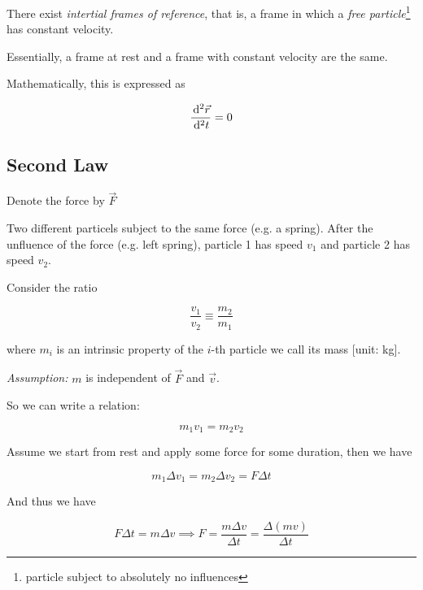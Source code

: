 There exist \textit{intertial frames of reference}, that is, a frame in which a \textit{free particle}\footnote{particle subject to absolutely no influences} has constant velocity.

\begin{remark}
	Essentially, a frame at rest and a frame with constant velocity are the same.
\end{remark}

Mathematically, this is expressed as

\begin{equation}
	\frac{\D^2 \vec r}{\D^2 t} = 0
\end{equation}

\subsection{Second Law}

Denote the force by $\vec F$

Two different particels subject to the same force (e.g. a spring). After the unfluence of the force (e.g. left spring), particle 1 has speed $v_1$ and particle 2 has speed $v_2$.

Consider the ratio

\begin{equation}
	\frac{v_1}{v_2} \equiv \frac{m_2}{m_1}
\end{equation}

where $m_i$ is an intrinsic property of the $i$-th particle we call its mass [unit: kg].

\textit{Assumption:} $m$ is independent of $\vec F$ and $\vec v$.

So we can write a relation:

\begin{equation}
	m_1 v_1 = m_2 v_2
\end{equation}

Assume we start from rest and apply some force for some duration, then we have

\begin{equation}
	m_1 \Delta v_1 = m_2 \Delta v_2 = F \Delta t
\end{equation}

And thus we have

\begin{equation} \label{eq:force-mv}
	F \Delta t = m \Delta v \implies F = \frac{m \Delta v}{\Delta t} = \frac{\Delta (mv)}{\Delta t} 
\end{equation}

